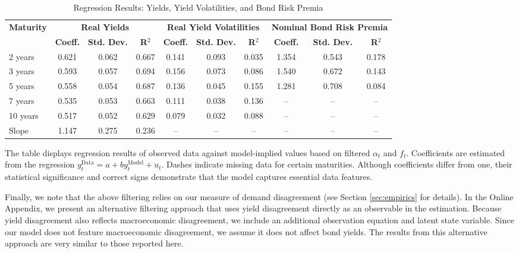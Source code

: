 \documentclass[preprint,11pt,authoryear]{elsarticle}
\theoremstyle{plain}
\begin{document}
\begin{table}[ht]
    \centering
    \begin{tabular}{lccccccccc}
        \toprule
        \multirow{2}{*}{\textbf{Maturity}} & \multicolumn{3}{c}{\textbf{Real Yields}} & \multicolumn{3}{c}{\textbf{Real Yield Volatilities}} & \multicolumn{3}{c}{\textbf{Nominal Bond Risk Premia}} \\
        \cmidrule(lr){2-4} \cmidrule(lr){5-7} \cmidrule(lr){8-10}
        & \textbf{Coeff.} & \textbf{Std. Dev.} & \textbf{R$^2$} & \textbf{Coeff.} & \textbf{Std. Dev.} & \textbf{R$^2$} & \textbf{Coeff.} & \textbf{Std. Dev.} & \textbf{R$^2$} \\
        \midrule
        2 years  & 0.621 & 0.062 & 0.667 & 0.141 & 0.093 & 0.035 & 1.354 & 0.543 & 0.178 \\
        3 years  & 0.593 & 0.057 & 0.694 & 0.156 & 0.073 & 0.086 & 1.540 & 0.672 & 0.143 \\
        5 years  & 0.558 & 0.054 & 0.687 & 0.136 & 0.045 & 0.155 & 1.281 & 0.708 & 0.084 \\
        7 years  & 0.535 & 0.053 & 0.663 & 0.111 & 0.038 & 0.136 & --    & --    & --    \\
        10 years & 0.517 & 0.052 & 0.629 & 0.079 & 0.032 & 0.088 & --    & --    & --    \\
        Slope    & 1.147 & 0.275 & 0.236 & --    & --    & --    & --    & --    & --    \\ 
        \bottomrule
    \end{tabular}
    \vspace{0.5em}
    \caption{Regression Results: Yields, Yield Volatilities, and Bond Risk Premia}
    \label{table:UKFOOS}
    \begin{minipage}{0.95\textwidth}
        \footnotesize{The table displays regression results of observed data against model-implied values based on filtered $\alpha_t$ and $f_t$. Coefficients are estimated from the regression $y^{\text{Data}}_t = a + b y^{\text{Model}}_t + u_t$. Dashes indicate missing data for certain maturities. Although coefficients differ from one, their statistical significance and correct signs demonstrate that the model captures essential data features.}
    \end{minipage}
\end{table}

Finally, we note that the above filtering relies on our measure of demand disagreement (see Section \ref{sec:empirics} for details). In the Online Appendix, we present an alternative filtering approach that uses yield disagreement directly as an observable in the estimation. Because yield disagreement also reflects macroeconomic disagreement, we include an additional observation equation and latent state variable. Since our model does not feature macroeconomic disagreement, we assume it does not affect bond yields. The results from this alternative approach are very similar to those reported here.
\end{document}
